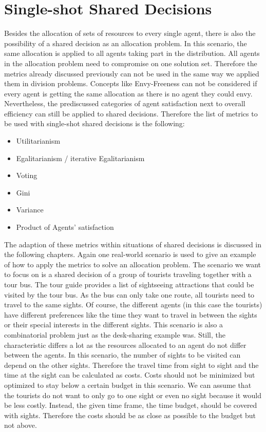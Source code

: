 \documentclass[german, a4paper, 11pt, oneside]{scrbook}
\begin{document}
\section{Single-shot Shared Decisions}
Besides the allocation of sets of resources to every single agent, there is also the possibility of a shared decision as an allocation problem. In this scenario, the same allocation is applied to all agents taking part in the distribution. All agents in the allocation problem need to compromise on one solution set. Therefore the metrics already discussed previously can not be used in the same way we applied them in division problems. Concepts like Envy-Freeness can not be considered if every agent is getting the same allocation as there is no agent they could envy. Nevertheless, the prediscussed categories of agent satisfaction next to overall efficiency can still be applied to shared decisions. Therefore the list of metrics to be used with single-shot shared decisions is the following:
\begin{itemize}
  \item Utilitarianism
  \item Egalitarianism / iterative Egalitarianism
  \item Voting
\item Gini
\item Variance
\item Product of Agents' satisfaction
\end{itemize}
The adaption of these metrics within situations of shared decisions is discussed in the following chapters. Again one real-world scenario is used to give an example of how to apply the metrics to solve an allocation problem. The scenario we want to focus on is a shared decision of a group of tourists traveling together with a tour bus. The tour guide provides a list of sightseeing attractions that could be visited by the tour bus. As the bus can only take one route, all tourists need to travel to the same sights. Of course, the different agents (in this case the tourists) have different preferences like the time they want to travel in between the sights or their special interests in the different sights. This scenario is also a combinatorial problem just as the desk-sharing example was. Still, the characteristic differs a lot as the resources allocated to an agent do not differ between the agents. In this scenario, the number of sights to be visited can depend on the other sights. Therefore the travel time from sight to sight and the time at the sight can be calculated as costs. Costs should not be minimized but optimized to stay below a certain budget in this scenario. We can assume that the tourists do not want to only go to one sight or even no sight because it would be less costly. Instead, the given time frame, the time budget, should be covered with sights. Therefore the costs should be as close as possible to the budget but not above.
\end{document}
